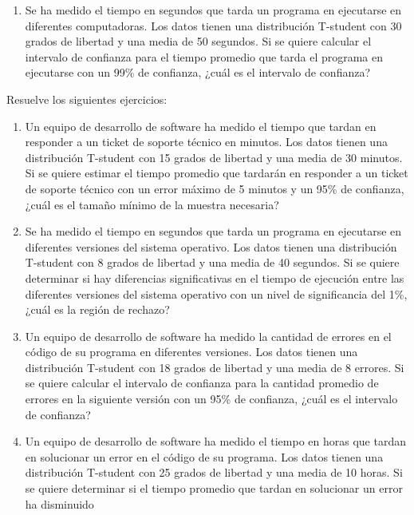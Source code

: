 \begin{Ejer}
\begin{enumerate}
\item Se ha medido el tiempo en segundos que tarda un programa en ejecutarse en diferentes computadoras. Los datos tienen una distribuci\'on T-student con 30 grados de libertad y una media de 50 segundos. Si se quiere calcular el intervalo de confianza para el tiempo promedio que tarda el programa en ejecutarse con un 99\% de confianza, ¿cu\'al es el intervalo de confianza?

\end{enumerate}
\end{Ejer} 


\begin{Ejer}
Resuelve los siguientes ejercicios:
\begin{enumerate}


\item Un equipo de desarrollo de software ha medido el tiempo que tardan en responder a un ticket de soporte t\'ecnico en minutos. Los datos tienen una distribuci\'on T-student con 15 grados de libertad y una media de 30 minutos. Si se quiere estimar el tiempo promedio que tardar\'an en responder a un ticket de soporte t\'ecnico con un error m\'aximo de 5 minutos y un 95\% de confianza, ¿cu\'al es el tama\~no m\'inimo de la muestra necesaria?

\item Se ha medido el tiempo en segundos que tarda un programa en ejecutarse en diferentes versiones del sistema operativo. Los datos tienen una distribuci\'on T-student con 8 grados de libertad y una media de 40 segundos. Si se quiere determinar si hay diferencias significativas en el tiempo de ejecuci\'on entre las diferentes versiones del sistema operativo con un nivel de significancia del 1\%, ¿cu\'al es la regi\'on de rechazo?

\item Un equipo de desarrollo de software ha medido la cantidad de errores en el c\'odigo de su programa en diferentes versiones. Los datos tienen una distribuci\'on T-student con 18 grados de libertad y una media de 8 errores. Si se quiere calcular el intervalo de confianza para la cantidad promedio de errores en la siguiente versi\'on con un 95\% de confianza, ¿cu\'al es el intervalo de confianza?

\item Un equipo de desarrollo de software ha medido el tiempo en horas que tardan en solucionar un error en el c\'odigo de su programa. Los datos tienen una distribuci\'on T-student con 25 grados de libertad y una media de 10 horas. Si se quiere determinar si el tiempo promedio que tardan en solucionar un error ha disminuido


\end{enumerate}
\end{Ejer}
